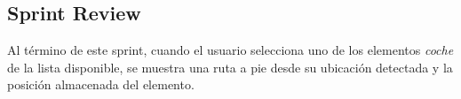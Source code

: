 	\subsection{Sprint Review}
	Al término de este sprint, cuando el usuario selecciona uno de los elementos \textit{coche} de la lista disponible, se muestra una ruta a pie desde su ubicación detectada y la posición almacenada del elemento.
	
